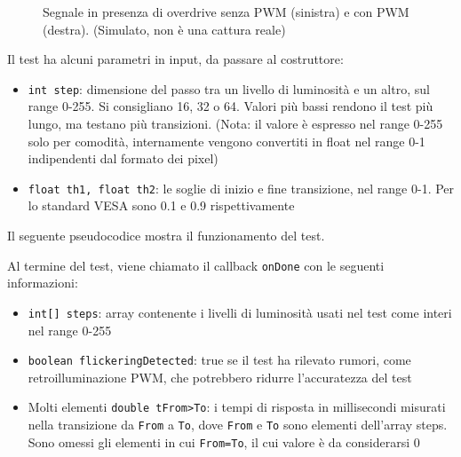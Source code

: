 \begin{figure}[H]
	\centering
	\caption{Segnale in presenza di overdrive senza PWM (sinistra) e con PWM (destra). (Simulato, non è una cattura reale)}
	\label{fig:pixelResponseTime_example2}
\end{figure}

Il test ha alcuni parametri in input, da passare al costruttore:\begin{itemize}
	\item \texttt{int step}: dimensione del passo tra un livello di luminosità e un altro, sul range 0-255. Si consigliano 16, 32 o 64. Valori più bassi rendono il test più lungo, ma testano più transizioni. (Nota: il valore è espresso nel range 0-255 solo per comodità, internamente vengono convertiti in float nel range 0-1 indipendenti dal formato dei pixel)
	\item \texttt{float th1, float th2}: le soglie di inizio e fine transizione, nel range 0-1. Per lo standard VESA sono 0.1 e 0.9 rispettivamente
\end{itemize}

Il seguente pseudocodice mostra il funzionamento del test.


Al termine del test, viene chiamato il callback \texttt{onDone} con le seguenti informazioni:\begin{itemize}
	\item \texttt{int[] steps}: array contenente i livelli di luminosità usati nel test come interi nel range 0-255
	\item \texttt{boolean flickeringDetected}: true se il test ha rilevato rumori, come retroilluminazione PWM, che potrebbero ridurre l'accuratezza del test
	\item Molti elementi \texttt{double tFrom>To}: i tempi di risposta in millisecondi misurati nella transizione da \texttt{From} a \texttt{To}, dove \texttt{From} e \texttt{To} sono elementi dell'array steps. Sono omessi gli elementi in cui \texttt{From=To}, il cui valore è da considerarsi 0
\end{itemize}

